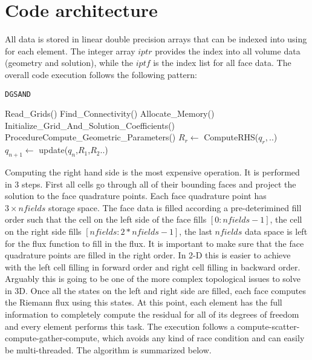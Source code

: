 \documentclass[11pt]{article}
\begin{document}
\section{Code architecture}
All data is stored in linear double precision arrays that can be indexed into using for each element. The integer array
$iptr$ provides the index into all volume data (geometry and solution), while the $iptf$ is the index list for all face data. The overall code execution follows the following pattern:
\begin{algorithm}
  \caption{\texttt{DGSAND}}
  \begin{algorithmic}[1]
    \State Read\_Grids()
    \State Find\_Connectivity()
    \State Allocate\_Memory()
    \State Initialize\_Grid\_And\_Solution\_Coefficients()
    \State Procedure{Compute\_Geometric\_Parameters()}
     \State $R_r \gets$ ComputeRHS($q_r,..$)
     \EndFor
     \State $q_{n+1} \gets$ update($q_n$,$R_1$,$R_2$..)
   \EndFor
  \end{algorithmic}
\end{algorithm}
Computing the right hand side is the most expensive operation. It is performed in 3 steps. First
all cells go through all of their bounding faces and project the solution to the face quadrature
points. Each face quadrature point has $3\times nfields$ storage space.
The face data is filled according a pre-deterimined fill order such that the cell on
the left side of the face fills $[0:nfields-1]$, the cell on the right side fills $[nfields:2*nfields-1]$, the last $nfields$ data space is left for the flux function to fill in the flux.
It is important to make sure that the face quadrature points are filled in the right order.
In 2-D this is easier to achieve with the left cell filling in forward order and right cell
filling in backward order. Arguably this is going to be one of the more complex topological
issues to solve in 3D. Once all the states on the left and right side are filled, each face
computes the Riemann flux using this states. At this point, each element has the full information
to completely compute the residual for all of its degrees of freedom and every element performs
this task. The execution follows a compute-scatter-compute-gather-compute, which avoids any
kind of race condition and can easily be multi-threaded. The algorithm is summarized below.
\end{document}
